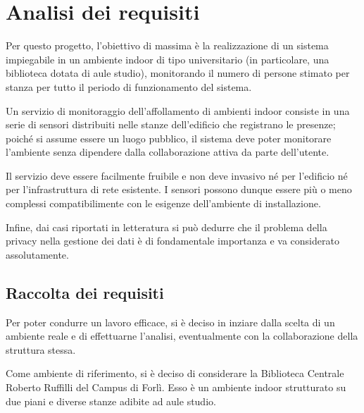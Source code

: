 \section{Analisi dei requisiti}



Per questo progetto, l'obiettivo di massima è la realizzazione di un sistema impiegabile in un ambiente indoor di tipo universitario (in particolare, una biblioteca dotata di aule studio),
monitorando il numero di persone stimato per stanza per tutto il periodo di funzionamento del sistema.


Un servizio di monitoraggio dell'affollamento di ambienti indoor consiste in una serie di sensori distribuiti nelle stanze dell'edificio che registrano le presenze;
poiché si assume essere un luogo pubblico, il sistema deve poter monitorare l'ambiente senza dipendere dalla collaborazione attiva da parte dell'utente.

Il servizio deve essere facilmente fruibile e non deve invasivo né per l'edificio né per l'infrastruttura di rete esistente.
I sensori possono dunque essere più o meno complessi compatibilimente con le esigenze dell'ambiente di installazione.

Infine, dai casi riportati in letteratura si può dedurre che il problema della privacy nella gestione dei dati è di fondamentale importanza e va considerato assolutamente.

\subsection{Raccolta dei requisiti}

Per poter condurre un lavoro efficace, si è deciso in inziare dalla scelta di un ambiente reale e di effettuarne l'analisi, eventualmente con la collaborazione della struttura stessa.

Come ambiente di riferimento, si è deciso di considerare la Biblioteca Centrale Roberto Ruffilli del Campus di Forlì.
Esso è un ambiente indoor strutturato su due piani e  diverse stanze adibite ad aule studio. %

